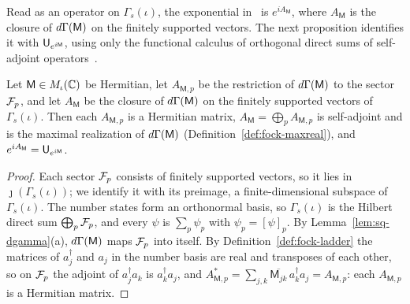 \begin{vetdenv}
Read as an operator on $\Gamma_s(\iota)$, the exponential in~\cite[(12)]{tjoacirac} is $e^{iA_{\mathsf M}}$, where
$A_{\mathsf M}$ is the closure of $d\Gamma(\mathsf M)$ on the finitely supported vectors. The next proposition identifies it
with $\mathsf U_{e^{i\mathsf M}}$, using only the functional calculus of orthogonal direct sums of self-adjoint
operators~\cite[Ch.~VIII]{rs1}.

\begin{proposition}\label{prop:sq-passive-exp}
Let $\mathsf M\in M_\iota(\mathbb C)$ be Hermitian, let $A_{\mathsf M,p}$ be the restriction of $d\Gamma(\mathsf M)$ to the sector
$\mathcal F_p$, and let $A_{\mathsf M}$ be the closure of $d\Gamma(\mathsf M)$ on the finitely supported vectors of $\Gamma_s(\iota)$.
Then each $A_{\mathsf M,p}$ is a Hermitian matrix, $A_{\mathsf M}=\bigoplus_pA_{\mathsf M,p}$ is self-adjoint and is the
maximal realization of $d\Gamma(\mathsf M)$ (Definition~\ref{def:fock-maxreal}), and $e^{iA_{\mathsf M}}=\mathsf U_{e^{i\mathsf M}}$.
\end{proposition}

\begin{proof}
Each sector $\mathcal F_p$ consists of finitely supported vectors, so it lies in $\jmath(\Gamma_s(\iota))$; we identify it
with its preimage, a finite-dimensional subspace of $\Gamma_s(\iota)$. The number states form an orthonormal basis, so
$\Gamma_s(\iota)$ is the Hilbert direct sum $\bigoplus_p\mathcal F_p$, and every $\psi$ is $\sum_p\psi_p$ with
$\psi_p=[\psi]_p$. By Lemma~\ref{lem:sq-dgamma}(a), $d\Gamma(\mathsf M)$ maps $\mathcal F_p$ into itself. By
Definition~\ref{def:fock-ladder} the matrices of $a_j^\dagger$ and $a_j$ in the number basis are real and transposes of
each other, so on $\mathcal F_p$ the adjoint of $a_j^\dagger a_k$ is $a_k^\dagger a_j$, and
$A_{\mathsf M,p}^*=\sum_{j,k}\overline{\mathsf M_{jk}}\,a_k^\dagger a_j=A_{\mathsf M,p}$: each $A_{\mathsf M,p}$ is a
Hermitian matrix.


\end{proof}
\end{vetdenv}
